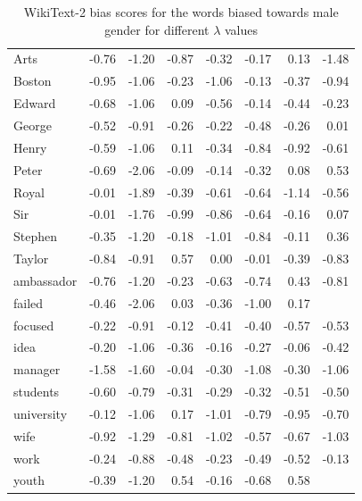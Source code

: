 \documentclass[11pt,a4paper]{article}
\begin{document}
\begin{table}[b]
\begin{tabular}{|l|r|r|r|r|r|r|r|}
Arts       & -0.76 & -1.20 & -0.87 & -0.32 & -0.17 & 0.13  & -1.48 \\
Boston     & -0.95 & -1.06 & -0.23 & -1.06 & -0.13 & -0.37 & -0.94 \\
Edward     & -0.68 & -1.06 & 0.09  & -0.56 & -0.14 & -0.44 & -0.23 \\
George     & -0.52 & -0.91 & -0.26 & -0.22 & -0.48 & -0.26 & 0.01  \\
Henry      & -0.59 & -1.06 & 0.11  & -0.34 & -0.84 & -0.92 & -0.61 \\
Peter      & -0.69 & -2.06 & -0.09 & -0.14 & -0.32 & 0.08  & 0.53  \\
Royal      & -0.01 & -1.89 & -0.39 & -0.61 & -0.64 & -1.14 & -0.56 \\
Sir        & -0.01 & -1.76 & -0.99 & -0.86 & -0.64 & -0.16 & 0.07  \\
Stephen    & -0.35 & -1.20 & -0.18 & -1.01 & -0.84 & -0.11 & 0.36  \\
Taylor     & -0.84 & -0.91 & 0.57  & 0.00  & -0.01 & -0.39 & -0.83 \\
ambassador & -0.76 & -1.20 & -0.23 & -0.63 & -0.74 & 0.43  & -0.81 \\
failed     & -0.46 & -2.06 & 0.03  & -0.36 & -1.00 & 0.17  &       \\
focused    & -0.22 & -0.91 & -0.12 & -0.41 & -0.40 & -0.57 & -0.53 \\
idea       & -0.20 & -1.06 & -0.36 & -0.16 & -0.27 & -0.06 & -0.42 \\
manager    & -1.58 & -1.60 & -0.04 & -0.30 & -1.08 & -0.30 & -1.06 \\
students   & -0.60 & -0.79 & -0.31 & -0.29 & -0.32 & -0.51 & -0.50 \\
university & -0.12 & -1.06 & 0.17  & -1.01 & -0.79 & -0.95 & -0.70 \\
wife       & -0.92 & -1.29 & -0.81 & -1.02 & -0.57 & -0.67 & -1.03 \\
work       & -0.24 & -0.88 & -0.48 & -0.23 & -0.49 & -0.52 & -0.13 \\
youth      & -0.39 & -1.20 & 0.54  & -0.16 & -0.68 & 0.58  &      
\\
\bottomrule
    \end{tabular}
    \caption{WikiText-2 bias scores for the words biased towards male gender for  different  $\lambda$  values}
    \label{tab:wm}
\end{table}
\end{document}
